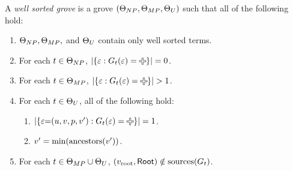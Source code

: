 \begin{definition}
  A \emph{well sorted grove} is a grove $(\Set[NP], \Set[MP], \Set[U])$ such that all of the following hold:
  \begin{enumerate}
    \item $\Set[NP], \Set[MP],$ and $\Set[U]$ contain only well sorted terms.
    \item For each $t \in \Set[NP]$, $\SizeOf{\SetOf{\e \SuchThat{G_t(\e) = \Plus}}} = 0$.
    \item For each $t \in \Set[MP]$, $\SizeOf{\SetOf{\e \SuchThat{G_t(\e) = \Plus}}} > 1$.
    \item For each $t \in \Set[U]$, all of the following hold:
      \begin{enumerate}
        \item $\SizeOf{\SetOf{\e{=}(u, v, p, v') \SuchThat{G_t(\e) = \Plus}}} = 1$.
        \item $v' = \min{\ancestors{v'}}$.
      \end{enumerate}
    \item For each $t \in \Set[MP] \cup \Set[U]$, $(\rootVertex, \Root) \notin \sources{G_t}$.
  \end{enumerate}
\end{definition}

